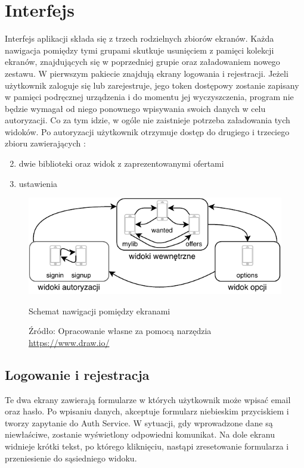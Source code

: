 \chapter{Interfejs}
\label{cha:interfejs}

Interfejs aplikacji składa się z trzech rodzielnych zbiorów ekranów. Każda nawigacja pomiędzy tymi grupami skutkuje usunięciem z pamięci kolekcji ekranów, znajdujących się w poprzedniej grupie oraz załadowaniem nowego zestawu.
W pierwszym pakiecie znajdują ekrany logowania i rejestracji. Jeżeli użytkownik zaloguje się lub zarejestruje, jego token dostępowy zostanie zapisany w pamięci podręcznej urządzenia i do momentu jej wyczyszczenia, program nie będzie wymagał od niego ponownego wpisywania swoich danych w celu autoryzacji. Co za tym idzie, w ogóle nie zaistnieje potrzeba załadowania tych widoków.
Po autoryzacji użytkownik otrzymuje dostęp do drugiego i trzeciego zbioru zawierających :
\begin{enumerate}
    \setcounter{enumi}{1}
    \item dwie biblioteki oraz widok z zaprezentowanymi ofertami
    \item ustawienia
\end{enumerate} 

\begin{figure}[H]
	\centering
	\includegraphics[width=\linewidth]{navig.pdf}
	\caption{\centering Schemat nawigacji pomiędzy ekranami}
	\caption*{\centering Źródło: {Opracowanie własne za pomocą narzędzia \url{https://www.draw.io/}}}
\end{figure}

\section{Logowanie i rejestracja}
Te dwa ekrany zawierają formularze w których użytkownik może wpisać email oraz hasło. Po wpisaniu danych, akceptuje formularz niebieskim przyciskiem i tworzy zapytanie do Auth Service. W sytuacji, gdy wprowadzone dane są niewłaściwe, zostanie wyświetlony odpowiedni komunikat.
Na dole ekranu widnieje krótki tekst, po którego kliknięciu, nastąpi zresetowanie formularza i przeniesienie do sąsiedniego widoku.

